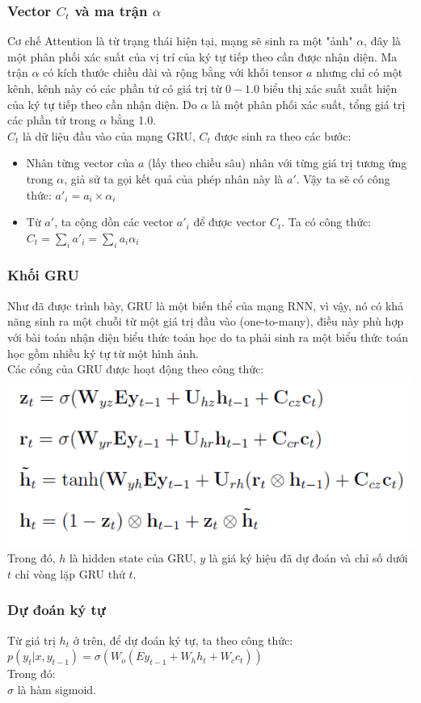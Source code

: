 \documentclass{beamer}
\begin{document}
\begin{frame}
	\frametitle{Vector $C_t$ và ma trận $\alpha$}
	Cơ chế Attention là từ trạng thái hiện tại, mạng sẽ sinh ra một "ảnh" $\alpha$, đây là một phân phối xác suất của vị trí của ký tự tiếp theo cần được nhận diện. Ma trận $\alpha$ có kích thước chiều dài và rộng bằng với khối tensor $a$ nhưng chỉ có một kênh, kênh này có các phần tử có giá trị từ $0 - 1.0$ biểu thị xác suất xuất hiện của ký tự tiếp theo cần nhận diện. Do $\alpha$ là một phân phối xác suất, tổng giá trị các phần tử trong $\alpha$ bằng 1.0.\\
	$C_t$ là dữ liệu đầu vào của mạng GRU, $C_t$ được sinh ra theo các bước:
	\begin{itemize}
		\item Nhân từng vector của $a$ (lấy theo chiều sâu) nhân với từng giá trị tương ứng trong $\alpha$, giả sử ta gọi kết quả của phép nhân này là $a'$. Vậy ta sẽ có công thức: $a'_i = a_i \times \alpha_i$
		\item Từ $a'$, ta cộng dồn các vector $a'_i$ để được vector $C_t$. Ta có công thức: $C_t = \sum_i a'_i = \sum_i a_i\alpha_i $
	\end{itemize}
\end{frame}

\begin{frame}
	\frametitle{Khối GRU}
	Như đã được trình bày, GRU là một biến thể của mạng RNN, vì vậy, nó có khả năng sinh ra một chuỗi từ một giá trị đầu vào (one-to-many), điều này phù hợp với bài toán nhận diện biểu thức toán học do ta phải sinh ra một biểu thức toán học gồm nhiều ký tự từ một hình ảnh.\\
	Các cổng của GRU được hoạt động theo công thức:
	\includegraphics[width=0.7\linewidth]{GRU.png} \\
	Trong đó, $h$ là hidden state của GRU, $y$ là giá ký hiệu đã dự đoán và chỉ số dưới $t$ chỉ vòng lặp GRU thứ $t$.
\end{frame}

\begin{frame}
	\frametitle{Dự đoán ký tự}
	Từ giá trị $h_t$ ở trên, để dự đoán ký tự, ta theo công thức:\\
	$p(y_t|x,y_{t-1}) = \sigma(W_o(Ey_{t-1}+W_hh_t+W_cc_t))$\\
	Trong đó: \\
	$\sigma$ là hàm sigmoid.
\end{frame}
\end{document}

